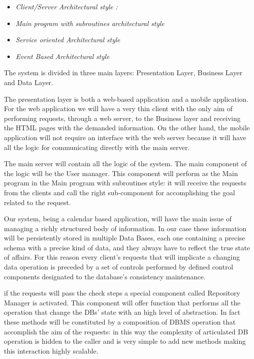 \begin{itemize}
\setlength{\leftskip}{0.5cm}
\item \emph{Client/Server Architectural style : }
\item \emph{Main program with subroutines architectural style}
\item \emph{Service oriented Architectural style}
\item \emph{Event Based Architectural style}
\end{itemize}

The system is divided in three main layers: Presentation Layer, Business Layer and Data Layer.

The presentation layer is both a web-based application and a mobile application. For the web application we will have a very thin client with the only aim of performing requests, through a web server, to the Business layer and receiving the HTML pages with the demanded information.
On the other hand, the mobile application will not require an interface with the web server because it will have all the logic for communicating directly with the main server.

The main server will contain all the logic of the system. The main component of the logic will be the User manager. This component will perform as the Main program in the Main program with subroutines style: it will receive the requests from the clients and call the right sub-component for accomplishing the goal related to the request.

Our system, being a calendar based application, will have the main issue of managing a richly structured body of information. In our case these information will be persistently stored in multiple Data Bases, each one containing a precise schema with a precise kind of data, and they always have to reflect the true state of affairs. For this reason every client's requests that will implicate a changing data operation is preceded by a set of controls performed by defined control components designated to the database’s consistency maintenance.

if the requests will pass the check steps a special component called Repository Manager is activated. This component will offer function that performs all the operation that change the DBs’ state with an high level of abstraction. In fact these methods will be constituted by a composition of DBMS operation that accomplish the aim of the requests: in this way the complexity of articulated DB operation is hidden to the caller and is very simple to add new methods making this interaction highly scalable.

